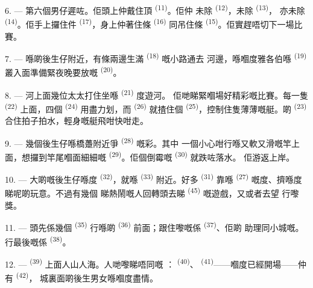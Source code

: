 6. --- 第六個男仔遲咗。佢頭上仲戴住頂 \textsuperscript{(11)}。佢仲
未除 \textsuperscript{(12)}，未除 \textsuperscript{(13)}，
亦未除 \textsuperscript{(14)}。佢手上攞住件
\textsuperscript{(17)}，身上仲著住條 \textsuperscript{(16)} 同吊住條
 \textsuperscript{(15)}。佢實趕唔切下一場比賽。

7. --- 喺啲後生仔附近，有條兩邊生滿 \textsuperscript{(18)} 嘅小路通去
河邊，喺嗰度雅各伯喺 \textsuperscript{(19)} 叢入面準備緊夜晚要放嘅
 \textsuperscript{(20)}。

\VUsaut{4.4mm}
\VUsaut{3.4mm}

8. --- 河上面幾位太太打住坐喺 \textsuperscript{(21)} 度遊河。
佢哋睇緊嗰場好精彩嘅比賽。每一隻 \textsuperscript{(22)} 上面，四個
 \textsuperscript{(24)} 用盡力划，而 \textsuperscript{(26)}
就揸住個 \textsuperscript{(25)}，控制住隻薄薄嘅艇。啲
\textsuperscript{(23)} 合住拍子拍水，輕身嘅艇飛咁快咁走。

9. --- 幾個後生仔喺橋躉附近爭 \textsuperscript{(28)} 嘅彩。其中
一個小心咁行喺又軟又滑嘅竿上面，想攞到竿尾嗰面細細嘅
\textsuperscript{(29)}。佢個倒霉嘅 \textsuperscript{(30)} 就跌咗落水。
佢游返上岸。

10. --- 大啲嘅後生仔喺度 \textsuperscript{(32)}，就喺
\textsuperscript{(33)} 附近。好多 \textsuperscript{(31)} 靠喺
\textsuperscript{(27)} 嘅度、擠喺度睇呢啲玩意。不過有幾個
睇熱鬧嘅人回轉頭去睇 \textsuperscript{(45)} 嘅遊戲，又或者去望
行嚟獎。

11. --- 頭先係幾個 \textsuperscript{(35)} 行喺啲
\textsuperscript{(36)} 前面；跟住嚟嘅係 \textsuperscript{(37)}、佢啲
助理同小城嘅。行最後嘅係 \textsuperscript{(38)}。

\VUsaut{5.0mm}
\VUsaut{3.6mm}

12. ---  \textsuperscript{(39)} 上面人山人海。人哋嚟睇唔同嘅
： \textsuperscript{(40)}、
\textsuperscript{(41)}——嗰度已經開場——仲有 \textsuperscript{(42)}，
城裏面啲後生男女喺嗰度盡情。

